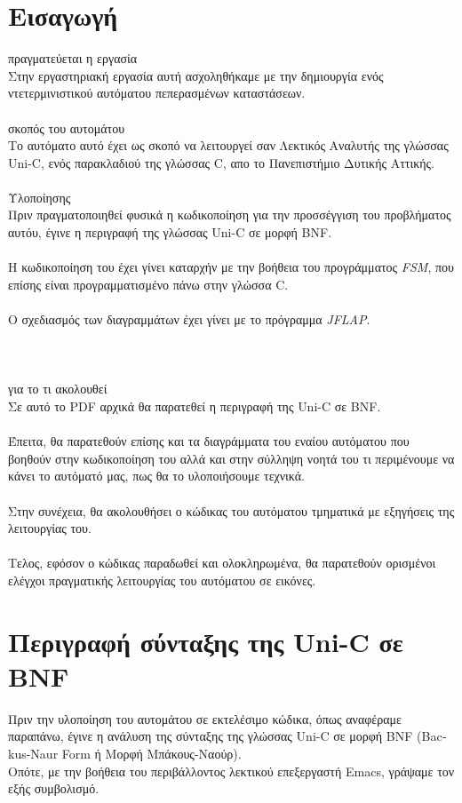 \documentclass[14pt]{extarticle}
\begin{document}
\section{Εισαγωγή}
\large{ πραγματεύεται η εργασία}
\\
Στην εργαστηριακή εργασία αυτή ασχοληθήκαμε με την δημιουργία ενός ντετερμινιστικού αυτόματου πεπερασμένων καταστάσεων.
\\
\\
\large{ σκοπός του αυτομάτου}
\\
Το αυτόματο αυτό έχει ως σκοπό να λειτουργεί σαν Λεκτικός Αναλυτής της γλώσσας \textlatin{Uni-C}, ενός παρακλαδιού της γλώσσας \textlatin{C}, απο το Πανεπιστήμιο Δυτικής Αττικής.  
\\
\\
\large{ Υλοποίησης}
\\
Πριν πραγματοποιηθεί φυσικά η κωδικοποίηση για την προσσέγγιση του προβλήματος αυτόυ, έγινε η περιγραφή της γλώσσας \textlatin{Uni-C} σε μορφή \textlatin{BNF}. 
\\
\\
Η κωδικοποίηση του έχει γίνει καταρχήν με την βοήθεια του προγράμματος \emph{\textlatin{FSM}}, που επίσης είναι προγραμματισμένο πάνω στην γλώσσα \textlatin{C}.
\\
\\
Ο σχεδιασμός των διαγραμμάτων έχει γίνει με το πρόγραμμα \emph{\textlatin {JFLAP}}.
\\
\\
\\
\\
\large{ για το τι ακολουθεί}
\\
Σε αυτό το \textlatin{PDF} αρχικά θα παρατεθεί η περιγραφή της \textlatin{Uni-C} σε \textlatin{BNF}.
\\
\\
Έπειτα, θα παρατεθούν επίσης και τα διαγράμματα του εναίου αυτόματου που βοηθούν στην κωδικοποίηση του αλλά και στην σύλληψη νοητά του τι περιμένουμε να κάνει το αυτόματό μας, πως θα το υλοποιήσουμε τεχνικά. 
\\
\\
Στην συνέχεια, θα ακολουθήσει ο κώδικας του αυτόματου τμηματικά με εξηγήσεις της λειτουργίας του.
\\
\\
Τελος, εφόσον ο κώδικας παραδωθεί και ολοκληρωμένα, θα παρατεθούν ορισμένοι ελέγχοι πραγματικής λειτουργίας του αυτόματου σε εικόνες.


\clearpage
\section{Περιγραφή σύνταξης της \textlatin{Uni-C} σε \textlatin{BNF}}
Πριν την υλοποίηση του αυτομάτου σε εκτελέσιμο κώδικα, όπως αναφέραμε παραπάνω, έγινε η ανάλυση της σύνταξης της γλώσσας \textlatin{Uni-C} σε μορφή \textlatin{BNF (Backus-Naur Form} ή Μορφή Μπάκους-Ναούρ).
\\
Οπότε, με την βοήθεια του περιβάλλοντος λεκτικού επεξεργαστή \textlatin{Emacs}, γράψαμε τον εξής συμβολισμό.   
\end{document}

